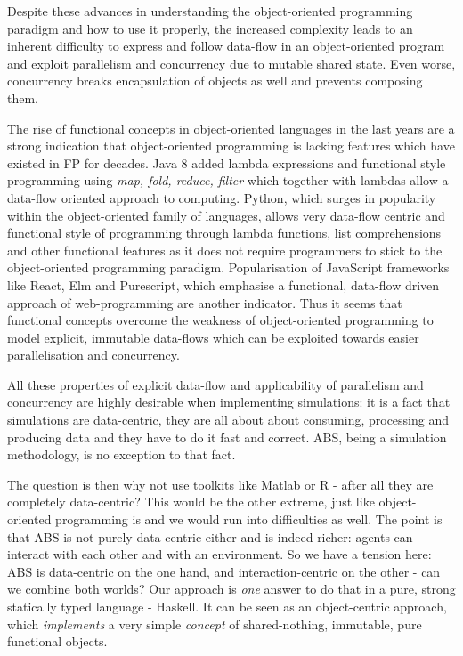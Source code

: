 Despite these advances in understanding the object-oriented programming paradigm and how to use it properly, the increased complexity leads to an inherent difficulty to express and follow data-flow in an object-oriented program and exploit parallelism and concurrency due to mutable shared state. Even worse, concurrency breaks encapsulation of objects as well and prevents composing them. 

The rise of functional concepts in object-oriented languages in the last years are a strong indication that object-oriented programming is lacking features which have existed in FP for decades. Java 8 added lambda expressions and functional style programming using \textit{map, fold, reduce, filter} which together with lambdas allow a data-flow oriented approach to computing. Python, which surges in popularity within the object-oriented family of languages, allows very data-flow centric and functional style of programming through lambda functions, list comprehensions and other functional features as it does not require programmers to stick to the object-oriented programming paradigm. Popularisation of JavaScript frameworks like React, Elm and Purescript, which emphasise a functional, data-flow driven approach of web-programming are another indicator. Thus it seems that functional concepts overcome the weakness of object-oriented programming to model explicit, immutable data-flows which can be exploited towards easier parallelisation and concurrency.

All these properties of explicit data-flow and applicability of parallelism and concurrency are highly desirable when implementing simulations: it is a fact that simulations are data-centric, they are all about about consuming, processing and producing data and they have to do it fast and correct. ABS, being a simulation methodology, is no exception to that fact.

The question is then why not use toolkits like Matlab or R - after all they are completely data-centric? This would be the other extreme, just like object-oriented programming is and we would run into difficulties as well. The point is that ABS is not purely data-centric either and is indeed richer: agents can interact with each other and with an environment. So we have a tension here: ABS is data-centric on the one hand, and interaction-centric on the other - can we combine both worlds? Our approach is \textit{one} answer to do that in a pure, strong statically typed language - Haskell. It can be seen as an object-centric approach, which \textit{implements} a very simple \textit{concept} of shared-nothing, immutable, pure functional objects.

